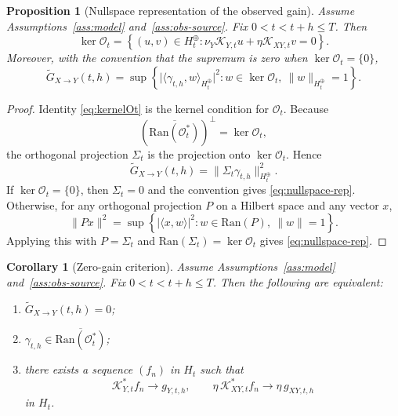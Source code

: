 \documentclass[11pt,a4paper]{amsart}
\theoremstyle{plain}
\newtheorem{proposition}[theorem]{Proposition}
\newtheorem{corollary}[theorem]{Corollary}
\theoremstyle{definition}
\theoremstyle{remark}
\begin{document}
\begin{proposition}[Nullspace representation of the observed gain]
\label{prop:nullspace}
Assume Assumptions~\ref{ass:model} and~\ref{ass:obs-source}. Fix $0<t<t+h\le T$. Then
\begin{equation}\label{eq:kernelOt}
\ker \mathcal O_t
=
\left\{
(u,v)\in H_t^\oplus:
\nu_Y\mathcal K_{Y,t}u+\eta\mathcal K_{XY,t}v=0
\right\}.
\end{equation}
Moreover, with the convention that the supremum is zero when $\ker\mathcal O_t=\{0\}$,
\begin{equation}\label{eq:nullspace-rep}
\widetilde G_{X\to Y}(t,h)
=
\sup\left\{
\bigl|\langle \gamma_{t,h},w\rangle_{H_t^\oplus}\bigr|^2:
w\in\ker \mathcal O_t,\ \|w\|_{H_t^\oplus}=1
\right\}.
\end{equation}
\end{proposition}

\begin{proof}
Identity \eqref{eq:kernelOt} is the kernel condition for $\mathcal O_t$.
Because
\[
(\overline{\mathrm{Ran}(\mathcal O_t^*)})^\perp=\ker \mathcal O_t,
\]
the orthogonal projection $\Sigma_t$ is the projection onto $\ker \mathcal O_t$. Hence
\[
\widetilde G_{X\to Y}(t,h)=\|\Sigma_t\gamma_{t,h}\|_{H_t^\oplus}^2.
\]
If $\ker\mathcal O_t=\{0\}$, then $\Sigma_t=0$ and the convention gives
\eqref{eq:nullspace-rep}. Otherwise, for any orthogonal projection $P$ on a Hilbert space and any
vector $x$,
\[
\|Px\|^2
=
\sup\left\{
|\langle x,w\rangle|^2 : w\in \mathrm{Ran}(P),\ \|w\|=1
\right\}.
\]
Applying this with $P=\Sigma_t$ and $\mathrm{Ran}(\Sigma_t)=\ker \mathcal O_t$ gives
\eqref{eq:nullspace-rep}.
\end{proof}

\begin{corollary}[Zero-gain criterion]\label{cor:zero-gain}
Assume Assumptions~\ref{ass:model} and~\ref{ass:obs-source}. Fix $0<t<t+h\le T$. Then the
following are equivalent:
\begin{enumerate}[label=(\roman*)]
\item $\widetilde G_{X\to Y}(t,h)=0$;
\item $\gamma_{t,h}\in\overline{\mathrm{Ran}(\mathcal O_t^*)}$;
\item there exists a sequence $(f_n)$ in $H_t$ such that
\[
\mathcal K_{Y,t}^*f_n\to g_{Y,t,h},
\qquad
\eta\,\mathcal K_{XY,t}^*f_n\to \eta\,g_{XY,t,h}
\]
in $H_t$.
\end{enumerate}
\end{corollary}
\end{document}
